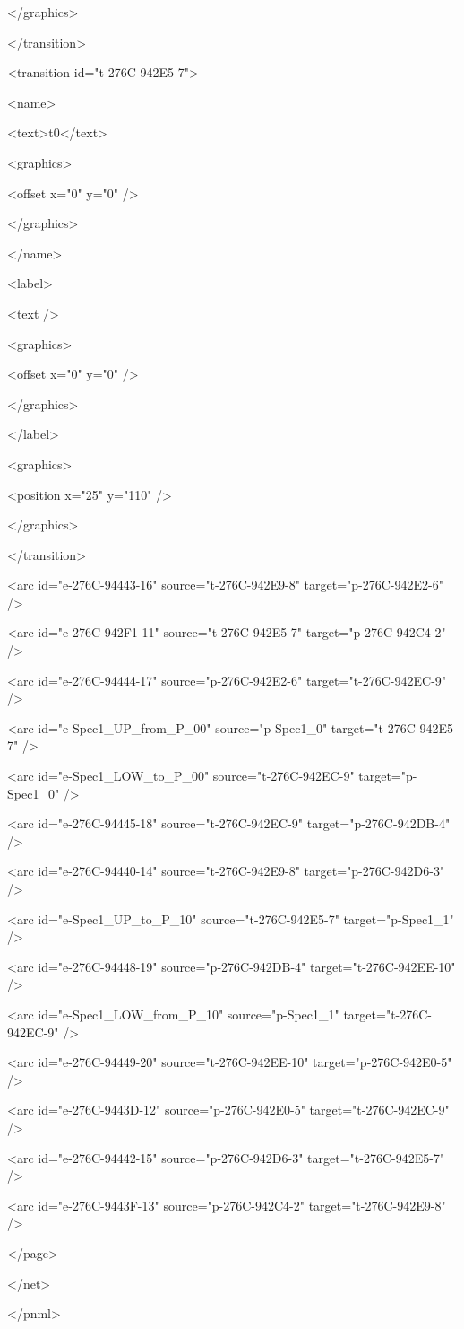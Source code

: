 </graphics>

</transition>

<transition id="t-276C-942E5-7">

<name>

<text>t0</text>

<graphics>

<offset x="0" y="0" />

</graphics>

</name>

<label>

<text />

<graphics>

<offset x="0" y="0" />

</graphics>

</label>

<graphics>

<position x="25" y="110" />

</graphics>

</transition>

<arc id="e-276C-94443-16" source="t-276C-942E9-8" target="p-276C-942E2-6" />

<arc id="e-276C-942F1-11" source="t-276C-942E5-7" target="p-276C-942C4-2" />

<arc id="e-276C-94444-17" source="p-276C-942E2-6" target="t-276C-942EC-9" />

<arc id="e-Spec1\_UP\_from\_P\_00" source="p-Spec1\_0" target="t-276C-942E5-7" />

<arc id="e-Spec1\_LOW\_to\_P\_00" source="t-276C-942EC-9" target="p-Spec1\_0" />

<arc id="e-276C-94445-18" source="t-276C-942EC-9" target="p-276C-942DB-4" />

<arc id="e-276C-94440-14" source="t-276C-942E9-8" target="p-276C-942D6-3" />

<arc id="e-Spec1\_UP\_to\_P\_10" source="t-276C-942E5-7" target="p-Spec1\_1" />

<arc id="e-276C-94448-19" source="p-276C-942DB-4" target="t-276C-942EE-10" />

<arc id="e-Spec1\_LOW\_from\_P\_10" source="p-Spec1\_1" target="t-276C-942EC-9" />

<arc id="e-276C-94449-20" source="t-276C-942EE-10" target="p-276C-942E0-5" />

<arc id="e-276C-9443D-12" source="p-276C-942E0-5" target="t-276C-942EC-9" />

<arc id="e-276C-94442-15" source="p-276C-942D6-3" target="t-276C-942E5-7" />

<arc id="e-276C-9443F-13" source="p-276C-942C4-2" target="t-276C-942E9-8" />

</page>

</net>

</pnml>
